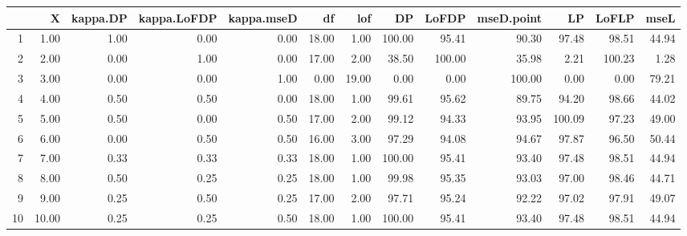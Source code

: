 \begin{table}[ht]
\centering
\begin{tabular}{rrrrrrrrrrrrr}
  \hline
 & X & kappa.DP & kappa.LoFDP & kappa.mseD & df & lof & DP & LoFDP & mseD.point & LP & LoFLP & mseL \\ 
  \hline
1 & 1.00 & 1.00 & 0.00 & 0.00 & 18.00 & 1.00 & 100.00 & 95.41 & 90.30 & 97.48 & 98.51 & 44.94 \\ 
  2 & 2.00 & 0.00 & 1.00 & 0.00 & 17.00 & 2.00 & 38.50 & 100.00 & 35.98 & 2.21 & 100.23 & 1.28 \\ 
  3 & 3.00 & 0.00 & 0.00 & 1.00 & 0.00 & 19.00 & 0.00 & 0.00 & 100.00 & 0.00 & 0.00 & 79.21 \\ 
  4 & 4.00 & 0.50 & 0.50 & 0.00 & 18.00 & 1.00 & 99.61 & 95.62 & 89.75 & 94.20 & 98.66 & 44.02 \\ 
  5 & 5.00 & 0.50 & 0.00 & 0.50 & 17.00 & 2.00 & 99.12 & 94.33 & 93.95 & 100.09 & 97.23 & 49.00 \\ 
  6 & 6.00 & 0.00 & 0.50 & 0.50 & 16.00 & 3.00 & 97.29 & 94.08 & 94.67 & 97.87 & 96.50 & 50.44 \\ 
  7 & 7.00 & 0.33 & 0.33 & 0.33 & 18.00 & 1.00 & 100.00 & 95.41 & 93.40 & 97.48 & 98.51 & 44.94 \\ 
  8 & 8.00 & 0.50 & 0.25 & 0.25 & 18.00 & 1.00 & 99.98 & 95.35 & 93.03 & 97.00 & 98.46 & 44.71 \\ 
  9 & 9.00 & 0.25 & 0.50 & 0.25 & 17.00 & 2.00 & 97.71 & 95.24 & 92.22 & 97.02 & 97.91 & 49.07 \\ 
  10 & 10.00 & 0.25 & 0.25 & 0.50 & 18.00 & 1.00 & 100.00 & 95.41 & 93.40 & 97.48 & 98.51 & 44.94 \\ 
   \hline
\end{tabular}
\end{table}
